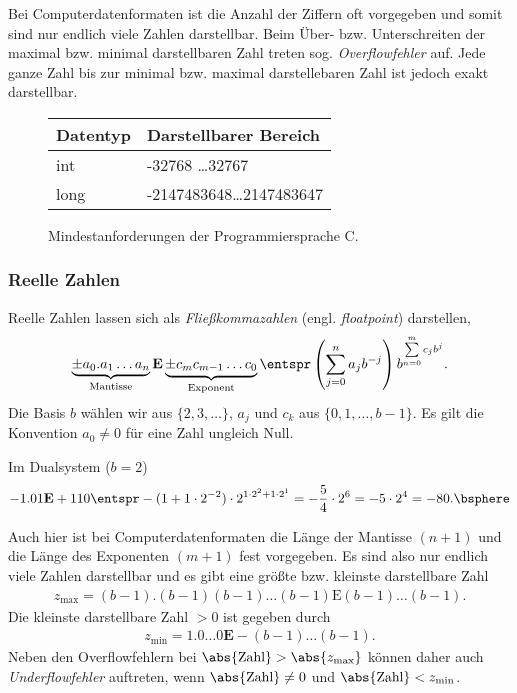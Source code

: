 Bei Computerdatenformaten ist die Anzahl der Ziffern oft vorgegeben und 
somit sind nur endlich viele Zahlen darstellbar. Beim Über- bzw. Unterschreiten
der maximal bzw. minimal darstellbaren Zahl treten sog. \emph{Overflowfehler}
auf. Jede ganze Zahl bis zur minimal bzw. maximal darstellebaren Zahl ist
jedoch exakt darstellbar.

\begin{figure}[h]
\begin{tabular}{l|l}
\textbf{Datentyp} & \textbf{Darstellbarer Bereich}\\\hline
{\color{blue}int} & -32768 \ldots 32767\\
{\color{blue}long} & -2147483648\ldots2147483647
\end{tabular}
\caption{Mindestanforderungen der Programmiersprache C.}
\end{figure}

\subsubsection{Reelle Zahlen}

Reelle Zahlen lassen sich als \emph{Fließkommazahlen} (engl.
\emph{floatpoint}) darstellen,
\begin{align*}
\underbrace{\pm a_0. a_1 \ldots a_n}_{\text{Mantisse}} \mathbf{E}
\underbrace{\pm c_m c_{m-1}\ldots c_0}_{\text{Exponent}}
\entspr \left(\sum\limits_{j=0}^n a_j b^{-j}\right) b^{\sum\limits_{n=0}^m
c_j b^j}.
\end{align*}
Die Basis $b$ wählen wir aus $\{2,3,\ldots\}$,  
$a_j$ und $c_k$ aus $\{0,1,\ldots,b-1\}$. Es gilt die Konvention
$a_0\neq 0$ für eine Zahl ungleich Null.
\begin{bsp}
Im Dualsystem ($b=2$) 
\begin{align*}
-1.01 \mathbf{E}+ 110 \entspr -(1 + 1\cdot 2^{-2})\cdot 2^{1\cdot 2^2+1\cdot
2^1} = -\frac{5}{4}\cdot 2^6 = - 5\cdot 2^4 = -80.\bsphere
\end{align*}
\end{bsp}
Auch hier ist bei Computerdatenformaten die Länge der Mantisse $(n+1)$ und die
Länge des Exponenten $(m+1)$ fest vorgegeben. Es sind also nur endlich viele
Zahlen darstellbar und es gibt eine größte bzw. kleinste darstellbare Zahl
\begin{align*}
z_{\text{max}}= (b-1).(b-1)(b-1)\ldots(b-1)\mathrm{E} (b-1)\ldots(b-1).
\end{align*}
Die kleinste darstellbare Zahl $>0$ ist gegeben durch
\begin{align*}
z_{\text{min}}= 1.0\ldots0\mathbf{E}- (b-1)\ldots(b-1).
\end{align*}
Neben den Overflowfehlern bei $\abs{\text{Zahl}} > \abs{z_{\text{max}}}$ können
daher auch \emph{Underflowfehler} auftreten, wenn
$\abs{\text{Zahl}}\neq 0$ und $\abs{\text{Zahl}} < z_{\text{min}}$.

